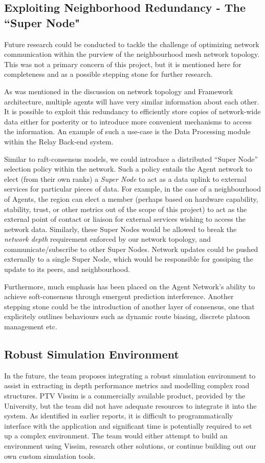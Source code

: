 \documentclass{report}
\begin{document}
\subsection{Exploiting Neighborhood Redundancy - The ``Super Node"}  %
Future research could be conducted to tackle the challenge of optimizing network communication within the purview of the neighbourhood mesh network topology.
This was not a primary concern of this project, but it is mentioned here for completeness and as a possible stepping stone for further research.

As was mentioned in the discussion on network topology and Framework architecture, multiple agents will have very similar information about each other.
It is possible to exploit this redundancy to efficiently store copies of network-wide data either for posterity or to introduce more convenient mechanisms to access the information.
An example of such a use-case is the Data Processing module within the Relay Back-end system.

Similar to raft-consensus models, we could introduce a distributed ``Super Node'' selection policy within the network.
Such a policy entails the Agent network to elect (from their own ranks) a \emph{Super Node} to act as a data uplink to external services for particular pieces of data.
For example, in the case of a neighbourhood of Agents, the region can elect a member (perhaps based on hardware capability, stability, trust, or other metrics out of the scope of this project) to act as the external point of contact or liaison for external services wishing to access the network data.
Similarly, these Super Nodes would be allowed to break the \emph{network depth} requirement enforced by our network topology, and communicate/subscribe to other Super Nodes.
Network updates could be pushed externally to a single Super Node, which would be responsible for gossiping the update to its peers, and neighbourhood.

Furthermore, much emphasis has been placed on the Agent Network's ability to achieve soft-consensus through emergent prediction interference.
Another stepping stone could be the introduction of another layer of consensus, one that explicitely outlines behaviours such as dynamic route biasing, discrete platoon management etc.

\subsection{Robust Simulation Environment}
In the future, the team proposes integrating a robust simulation environment to assist in extracting in depth performance metrics and modelling complex road structures. 
PTV Vissim is a commercially available product, provided by the University, but the team did not have adequate resources to integrate it into the system. 
As identified in earlier reports, it is difficult to programmatically interface with the application and significant time is potentially required to set up a complex environment. 
The team would either attempt to build an environment using Vissim, research other solutions, or continue building out our own custom simulation tools.
\end{document}
